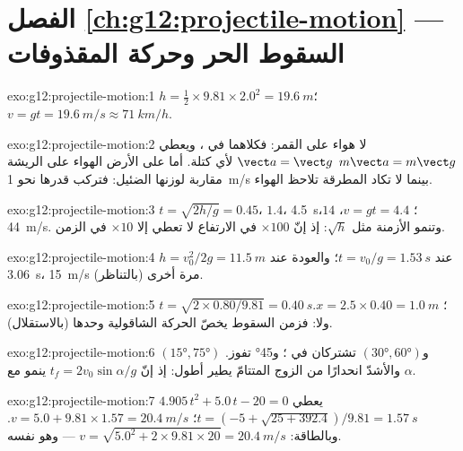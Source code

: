 \section*{الفصل \ref{ch:g12:projectile-motion} --- السقوط الحر وحركة المقذوفات}

\begin{solution}{exo:g12:projectile-motion:1}
$h = \tfrac12 \times 9.81 \times 2.0^2 = \qty{19.6}{m}$؛
$v = gt = \qty{19.6}{m/s} \approx \qty{71}{km/h}$.
\end{solution}

\begin{solution}{exo:g12:projectile-motion:2}
لا هواء على القمر: فكلاهما في ، ويعطي $m\vect a = m\vect g$
$\vect a = \vect g$ لأي كتلة. أما على الأرض  الهواء على الريشة
مقاربة لوزنها الضئيل: فتركب  قدرها نحو
\qty{1}{m/s} بينما لا تكاد المطرقة تلاحظ الهواء.
\end{solution}

\begin{solution}{exo:g12:projectile-motion:3}
$t = \sqrt{2h/g} = 0.45$، $1.4$، \qty{4.5}{s}؛
$v = gt = 4.4$، $14$، \qty{44}{m/s}. وتنمو الأزمنة مثل $\sqrt h$:
إذ إنّ $\times 100$ في الارتفاع لا تعطي إلا $\times 10$ في الزمن.
\end{solution}

\begin{solution}{exo:g12:projectile-motion:4}
$h = v_0^2/2g = \qty{11.5}{m}$ عند $t = v_0/g = \qty{1.53}{s}$؛
والعودة عند \qty{3.06}{s}،  \qty{15}{m/s} مرة أخرى (بالتناظر).
\end{solution}

\begin{solution}{exo:g12:projectile-motion:5}
$t = \sqrt{2 \times 0.80/9.81} = \qty{0.40}{s}$؛
$x = 2.5 \times 0.40 = \qty{1.0}{m}$. ولا: فزمن السقوط يخصّ
الحركة الشاقولية وحدها (بالاستقلال).
\end{solution}

\begin{solution}{exo:g12:projectile-motion:6}
$(\ang{15},\ang{75})$ و$(\ang{30},\ang{60})$ تشتركان في ؛
و\ang{45} تفوز. والأشدّ انحدارًا من الزوج المتتامّ يطير أطول:
إذ إنّ $t_f = 2v_0\sin\alpha/g$ ينمو مع $\alpha$.
\end{solution}

\begin{solution}{exo:g12:projectile-motion:7}
يعطي $4.905\,t^2 + 5.0\,t - 20 = 0$
$t = (-5 + \sqrt{25 + 392.4})/9.81 = \qty{1.57}{s}$؛
$v = 5.0 + 9.81 \times 1.57 = \qty{20.4}{m/s}$. وبالطاقة:
$v = \sqrt{5.0^2 + 2 \times 9.81 \times 20} = \qty{20.4}{m/s}$ ---
وهو نفسه.
\end{solution}

